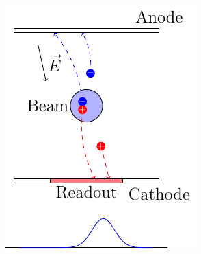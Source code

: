 \begin{frame}[t]
\begin{columns}
\begin{column}{0.45\textwidth}
      \includegraphics[width=\textwidth]{03_SIM/fig/fig000_IPM_distorsion.pdf}
    \end{column}
  \end{columns}
\end{frame}

